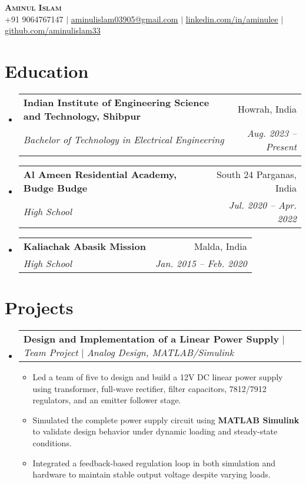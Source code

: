 \documentclass[letterpaper,11pt]{article}
\makeatletter
\newcommand{\resumeItem}[1]{
  \item\small{
    {#1 \vspace{-2pt}}
  }
}
\newcommand{\resumeSubheading}[4]{
  \vspace{-2pt}\item
    \begin{tabular*}{0.97\textwidth}[t]{l@{\extracolsep{\fill}}r}
      \textbf{#1} & #2 \\
      \textit{\small#3} & \textit{\small #4} \\
    \end{tabular*}\vspace{-7pt}
}
\newcommand{\resumeProjectHeading}[2]{
    \item
    \begin{tabular*}{0.97\textwidth}{l@{\extracolsep{\fill}}r}
      \small#1 & #2 \\
    \end{tabular*}\vspace{-7pt}
}
\newcommand{\resumeSubHeadingListStart}{\begin{itemize}[leftmargin=0.15in, label={}]}
\newcommand{\resumeSubHeadingListEnd}{\end{itemize}}
\newcommand{\resumeItemListStart}{\begin{itemize}}
\newcommand{\resumeItemListEnd}{\end{itemize}\vspace{-5pt}}
\makeatother
\begin{document}

\begin{center}
    \textbf{\Huge \scshape Aminul Islam} \\ \vspace{1pt}
    \small +91 9064767147 $|$ \href{mailto:aminulislam03905@gmail.com}{\underline{aminulislam03905@gmail.com}} $|$ 
    \href{https://linkedin.com/in/aminulee}{\underline{linkedin.com/in/aminulee}} $|$
    \href{https://github.com/aminulislam33}{\underline{github.com/aminulislam33}}
\end{center}


\section{Education}
  \resumeSubHeadingListStart
    \resumeSubheading
      {Indian Institute of Engineering Science and Technology, Shibpur}{Howrah, India}
      {Bachelor of Technology in Electrical Engineering}{Aug. 2023 -- Present}
      \resumeSubheading
      {Al Ameen Residential Academy, Budge Budge}{South 24 Parganas, India}
      {High School}{Jul. 2020 -- Apr. 2022}
    \resumeSubheading
      {Kaliachak Abasik Mission}{Malda, India}
      {High School}{Jan. 2015 -- Feb. 2020}
  \resumeSubHeadingListEnd


\section{Projects}
  \resumeSubHeadingListStart

    \resumeProjectHeading
      {\textbf{Design and Implementation of a Linear Power Supply} $|$ \emph{Team Project} $|$ \emph{Analog Design, MATLAB/Simulink}} {}
      \resumeItemListStart
        \resumeItem{Led a team of five to design and build a 12V DC linear power supply using transformer, full-wave rectifier, filter capacitors, 7812/7912 regulators, and an emitter follower stage.}
        \resumeItem{Simulated the complete power supply circuit using \textbf{MATLAB Simulink} to validate design behavior under dynamic loading and steady-state conditions.}
        \resumeItem{Integrated a feedback-based regulation loop in both simulation and hardware to maintain stable output voltage despite varying loads.}
      \resumeItemListEnd

  \resumeSubHeadingListEnd




\end{document}
